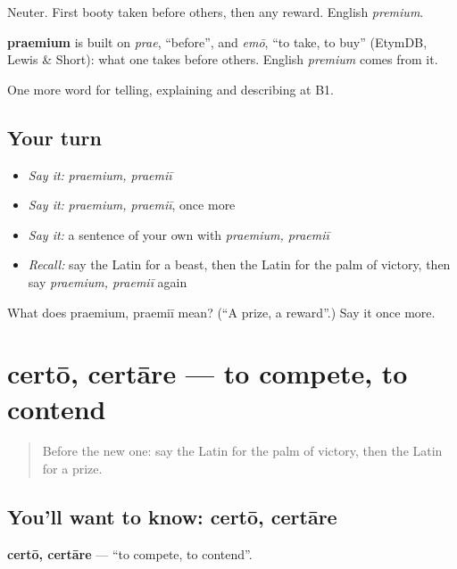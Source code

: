 Neuter. First booty taken before others, then any reward. English \emph{premium}.

\begin{cousinweb}
\textbf{praemium} is built on \emph{prae}, \textquotedblleft{}before\textquotedblright{}, and \emph{emō}, \textquotedblleft{}to take, to buy\textquotedblright{} (EtymDB, Lewis \& Short): what one takes before others. English \emph{premium} comes from it.
\end{cousinweb}

\begin{grammarlens}[title={What you've built}]
One more word for telling, explaining and describing at B1.
\end{grammarlens}

\subsection*{Your turn}
\begin{itemize}
\raggedright
  \item \emph{Say it:} \emph{praemium, praemiī}
  \item \emph{Say it:} \emph{praemium, praemiī}, once more
  \item \emph{Say it:} a sentence of your own with \emph{praemium, praemiī}
  \item \emph{Recall:} say the Latin for a beast, then the Latin for the palm of victory, then say \emph{praemium, praemiī} again
\end{itemize}

\begin{tcolorbox}[breakable,colback=teal!4,colframe=teal!35!black,title={Before you move on}]
What does praemium, praemiī mean? (\textquotedblleft{}A prize, a reward\textquotedblright{}.) Say it once more.
\end{tcolorbox}
\section[certō, certāre]{certō, certāre — to compete, to contend}

\label{lesson:LA-C337-certo}



\begin{quote}
Before the new one: say the Latin for the palm of victory, then the Latin for a prize.
\end{quote}

\subsection*{You'll want to know: certō, certāre}
\textbf{certō, certāre} — \textquotedblleft{}to compete, to contend\textquotedblright{}.

